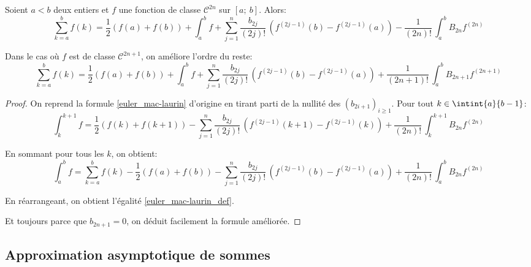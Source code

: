 \begin{theo}
Soient $a < b$ deux entiers et $f$ une fonction de classe $\mathcal{C}^{2n}$ sur $[a;~b]$. Alors:
\begin{equation}
\label{euler_mac-laurin_def}
\displaystyle{\sum_{k=a}^b} f(k) = \frac{1}{2}\left ( f(a) + f(b) \right )+ \displaystyle{\int_a^b} f + \displaystyle{\sum_{j=1}^n} \frac{b_{2j}}{(2j)!} \, \left ( f^{(2j-1)}(b) - f^{(2j-1)}(a)\right ) - \frac{1}{(2n)!} \, \displaystyle{\int_a^b} B_{2n} f^{(2n)}
\end{equation}


Dans le cas où $f$ est de classe $\mathcal{C}^{2n+1}$, on améliore l'ordre du reste:
\begin{equation}
\label{euler_mac-laurin_ordre}
\displaystyle{\sum_{k=a}^b} f(k) = \frac{1}{2}\left ( f(a) + f(b) \right )+ \displaystyle{\int_a^b} f + \displaystyle{\sum_{j=1}^n} \frac{b_{2j}}{(2j)!} \, \left ( f^{(2j-1)}(b) - f^{(2j-1)}(a)\right ) + \frac{1}{(2n+1)!} \, \displaystyle{\int_a^b} B_{2n+1} f^{(2n+1)}
\end{equation}
\end{theo}

\begin{proof}
On reprend la formule \ref{euler_mac-laurin} d'origine en tirant parti de la nullité des $(b_{2i+1})_{i \geq 1}$. Pour tout $k \in \intint{a}{b-1}$:
\[
\displaystyle{\int_k^{k+1}} f = \frac{1}{2}\left ( f(k) + f(k+1) \right ) - \displaystyle{\sum_{j=1}^{n}} \frac{b_{2j}}{(2j)!} \, \left ( f^{(2j-1)}(k+1) - f^{(2j-1)}(k)\right ) + \frac{1}{(2n)!} \, \displaystyle{\int_k^{k+1}} B_{2n} f^{(2n)}
\]

En sommant pour tous les $k$, on obtient:
\[
\displaystyle{\int_a^{b}} f = \displaystyle{\sum_{k=a}^b} f(k) - \frac{1}{2}\left ( f(a) + f(b) \right ) - \displaystyle{\sum_{j=1}^{n}} \frac{b_{2j}}{(2j)!} \, \left ( f^{(2j-1)}(b) - f^{(2j-1)}(a)\right ) + \frac{1}{(2n)!} \, \displaystyle{\int_a^b} B_{2n} f^{(2n)}
\]

En réarrangeant, on obtient l'égalité \ref{euler_mac-laurin_def}.

\medskip
Et toujours parce que $b_{2n+1} = 0$, on déduit facilement la formule améliorée.
\end{proof}

\subsection{Approximation asymptotique de sommes}

